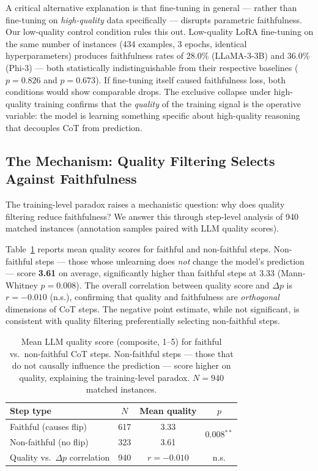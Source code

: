 \documentclass[11pt]{article}
\begin{document}
A critical alternative explanation is that fine-tuning in general --- rather
than fine-tuning on \emph{high-quality} data specifically --- disrupts
parametric faithfulness. Our low-quality control condition rules this out.
Low-quality LoRA fine-tuning on the same number of instances
(434 examples, 3 epochs, identical hyperparameters) produces faithfulness rates
of 28.0\% (LLaMA-3-3B) and 36.0\% (Phi-3) --- both statistically
indistinguishable from their respective baselines ($p = 0.826$ and
$p = 0.673$). If fine-tuning itself caused faithfulness loss, both conditions
would show comparable drops. The exclusive collapse under high-quality training
confirms that the \emph{quality} of the training signal is the operative
variable: the model is learning something specific about high-quality reasoning
that decouples CoT from prediction.

\subsection{The Mechanism: Quality Filtering Selects Against Faithfulness}
\label{sec:mechanism}

The training-level paradox raises a mechanistic question: why does quality
filtering reduce faithfulness? We answer this through step-level analysis of
940 matched instances (annotation samples paired with LLM quality scores).

Table~\ref{tab:mechanism} reports mean quality scores for faithful and
non-faithful steps. Non-faithful steps --- those whose unlearning does \emph{not}
change the model's prediction --- score \textbf{3.61} on average, significantly
higher than faithful steps at 3.33 (Mann-Whitney $p = 0.008$). The overall
correlation between quality score and $\Delta p$ is $r = -0.010$ (n.s.),
confirming that quality and faithfulness are \emph{orthogonal} dimensions of
CoT steps. The negative point estimate, while not significant, is consistent
with quality filtering preferentially selecting non-faithful steps.

\begin{table}[t]
\centering
\small
\caption{Mean LLM quality score (composite, 1--5) for faithful vs.\
non-faithful CoT steps. Non-faithful steps --- those that do not causally
influence the prediction --- score higher on quality, explaining the
training-level paradox. $N = 940$ matched instances.}
\label{tab:mechanism}
\begin{tabular}{lccc}
\toprule
Step type & $N$ & Mean quality & $p$ \\
\midrule
Faithful (causes flip)      & 617 & 3.33 & \multirow{2}{*}{0.008$^{**}$} \\
Non-faithful (no flip) & 323 & 3.61 & \\
\midrule
Quality vs.\ $\Delta p$ correlation & 940 & $r = -0.010$ & n.s. \\
\bottomrule
\end{tabular}
\end{table}
\end{document}
